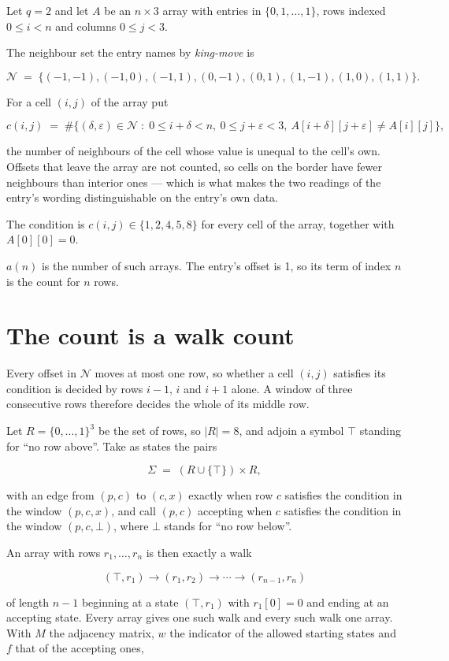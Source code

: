 \documentclass[11pt]{article}
\theoremstyle{definition}
\begin{document}
Let $q = 2$ and let $A$ be an $n \times 3$ array with entries in $\{0,1,\dots,1\}$, rows indexed $0 \le i < n$ and columns $0 \le j < 3$.

The neighbour set the entry names by {\itshape king-move} is

\[\mathcal{N} \;=\; \{(-1,-1), (-1,0), (-1,1), (0,-1), (0,1), (1,-1), (1,0), (1,1)\}.\]

For a cell $(i,j)$ of the array put

\[c(i,j) \;=\; \#\bigl\{(\delta,\varepsilon)\in\mathcal{N} \;:\; 0\le i+\delta<n,\ 0\le j+\varepsilon<3,\ A[i+\delta][j+\varepsilon] \neq A[i][j]\bigr\},\]

the number of neighbours of the cell whose value is unequal to the cell's own. Offsets that leave the array are not counted, so cells on the border have fewer neighbours than interior ones --- which is what makes the two readings of the entry's wording distinguishable on the entry's own data.

The condition is $c(i,j) \in \{1, 2, 4, 5, 8\}$ for every cell of the array, together with $A[0][0]=0$.

$a(n)$ is the number of such arrays. The entry's offset is 1, so its term of index $n$ is the count for $n$ rows.

\section{The count is a walk count}

Every offset in $\mathcal{N}$ moves at most one row, so whether a cell $(i,j)$ satisfies its condition is decided by rows $i-1$, $i$ and $i+1$ alone. A window of three consecutive rows therefore decides the whole of its middle row.

Let $R = \{0,\dots,1\}^{3}$ be the set of rows, so $|R| = 8$, and adjoin a symbol $\top$ standing for ``no row above''. Take as states the pairs

\[\Sigma \;=\; (R \cup \{\top\}) \times R,\]

with an edge from $(p,c)$ to $(c,x)$ exactly when row $c$ satisfies the condition in the window $(p,c,x)$, and call $(p,c)$ accepting when $c$ satisfies the condition in the window $(p,c,\bot)$, where $\bot$ stands for ``no row below''.

An array with rows $r_1,\dots,r_n$ is then exactly a walk

\[(\top,r_1) \to (r_1,r_2) \to \cdots \to (r_{n-1},r_n)\]

of length $n-1$ beginning at a state $(\top,r_1)$ with $r_1[0]=0$ and ending at an accepting state. Every array gives one such walk and every such walk one array. With $M$ the adjacency matrix, $w$ the indicator of the allowed starting states and $f$ that of the accepting ones,
\end{document}
